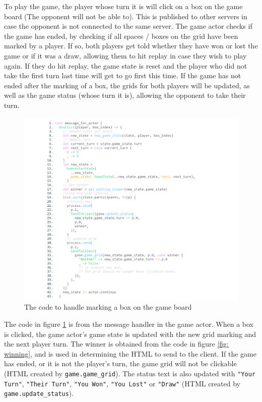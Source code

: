 \documentclass[]{final}
\begin{document}
To play the game, the player whose turn it is will click on a box on the game board
(The opponent will not be able to). This is published to other servers in case the
opponent is not connected to the same server. The game actor checks if the game
has ended, by checking if all spaces / boxes on the grid have been marked by a player.
If so, both players get told whether they have won or lost the game or if it was a draw,
allowing them to hit replay in case they wish to play again. If they do hit replay,
the game state is reset and the player who did not take the first turn last time
will get to go first this time. If the game has not ended after the marking of a box,
the grids for both players will be updated, as well as the game status (whose turn it is),
allowing the opponent to take their turn.

\newpage

\begin{figure}[H]
  \centering
  \includegraphics[width=\textwidth]{box_click.pdf}
  \caption{The code to handle marking a box on the game board}\label{fig: boxclick}
\end{figure}

The code in figure \ref{fig: boxclick} is from the message handler in the game actor.
When a box is clicked, the game actor's game state is updated with the new
grid marking and the next player turn. The winner is obtained from the code in
figure \ref{fig: winning}, and is used in determining the HTML to send to the client.
If the game has ended, or it is not the player's turn, the game grid will not be
clickable (HTML created by \lstinline|game.game_grid|). The status text is also
updated with \lstinline|"Your Turn"|, \lstinline|"Their Turn"|, \lstinline|"You Won"|,
\lstinline|"You Lost"| or \lstinline|"Draw"| (HTML created by \lstinline|game.update_status|).
\end{document}

